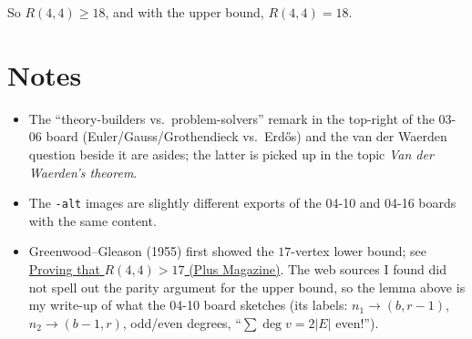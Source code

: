 \documentclass[11pt]{article}
\begin{document}
So $R(4,4)\ge18$, and with the upper bound, $R(4,4)=18$.

\section*{Notes}
\begin{itemize}[nosep]
  \item The ``theory-builders vs.\ problem-solvers'' remark in the top-right of the 03-06 board (Euler/Gauss/Grothendieck vs.\ Erd\H{o}s) and the van der Waerden question beside it are asides; the latter is picked up in the topic \emph{Van der Waerden's theorem}.
  \item The \texttt{-alt} images are slightly different exports of the 04-10 and 04-16 boards with the same content.
  \item Greenwood--Gleason (1955) first showed the $17$-vertex lower bound; see \href{https://plus.maths.org/proving-r4417}{Proving that $R(4,4)>17$ (Plus Magazine)}. The web sources I found did not spell out the parity argument for the upper bound, so the lemma above is my write-up of what the 04-10 board sketches (its labels: $n_1\to(b,r-1)$, $n_2\to(b-1,r)$, odd/even degrees, ``$\sum\deg v=2|E|$ even!'').
\end{itemize}
\end{document}

